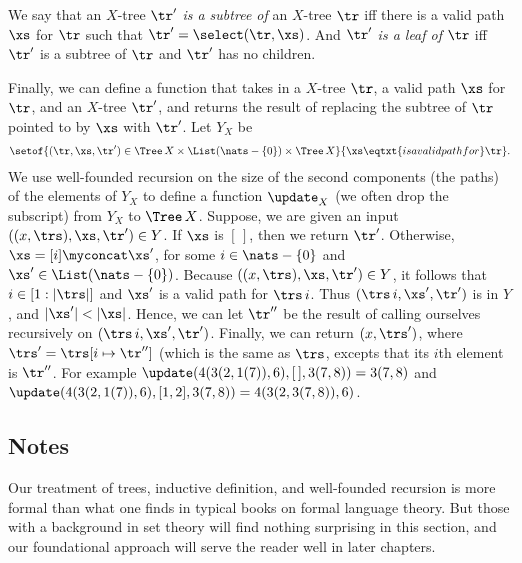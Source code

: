 We say that an $X$-tree $\tr'$ \emph{is a subtree of} an $X$-tree
$\tr$ iff there is a valid path $\xs$ for $\tr$ such that
$\tr'=\select(\tr,\xs)$.  And $\tr'$ \emph{is a leaf of} $\tr$
iff $\tr'$ is a subtree of $\tr$ and $\tr'$ has no children.

Finally, we can define a function that takes in a $X$-tree $\tr$,
a valid path $\xs$ for $\tr$, and an $X$-tree $\tr'$, and
returns the result of replacing the subtree of $\tr$ pointed
to by $\xs$ with $\tr'$.
Let $Y_X$ be
\begin{gather*}
\setof{(\tr,\xs,\tr')
\in\Tree\,X\times\List(\nats-\{0\})\times\Tree\,X}%
{\xs\eqtxt{is a valid path for}\tr} .
\end{gather*}
We use well-founded recursion on the size of the second components
(the paths) of the elements of $Y_X$ to define a function $\update_X$
(we often drop the subscript) from $Y_X$ to $\Tree\,X$.
Suppose, we are given an input $((x,\trs),\xs,\tr')\in Y$.  If
$\xs$ is $[\,]$, then we return $\tr'$.  Otherwise,
$\xs=[i]\myconcat\xs'$, for some $i\in\nats-\{0\}$ and
$\xs'\in\List(\nats-\{0\})$.  Because $((x,\trs),\xs,\tr')\in Y$,
it follows that $i\in[1:|\trs|]$ and $\xs'$ is a valid path
for $\trs\,i$.  Thus $(\trs\,i, \xs', \tr')$ is in $Y$, and
$|\xs'|<|\xs|$.  Hence, we can let $\tr''$ be the result of
calling ourselves recursively on $(\trs\,i, \xs', \tr')$.
Finally, we can return $(x,\trs')$, where $\trs'=
\trs[i\mapsto\tr'']$ (which is the same as $\trs$, excepts that
its $i$th element is $\tr''$.
For example $\update(4(3(2,1(7)),6), [\,], 3(7,8)) = 3(7,8)$ and
$\update(4(3(2,1(7)),6), [1,2], 3(7,8)) =
4(3(2,3(7,8)),6)$.

\subsection{Notes}

Our treatment of trees, inductive definition, and well-founded
recursion is more formal than what one finds in typical books on
formal language theory.  But those with a background in set theory
will find nothing surprising in this section, and our foundational
approach will serve the reader well in later chapters.

